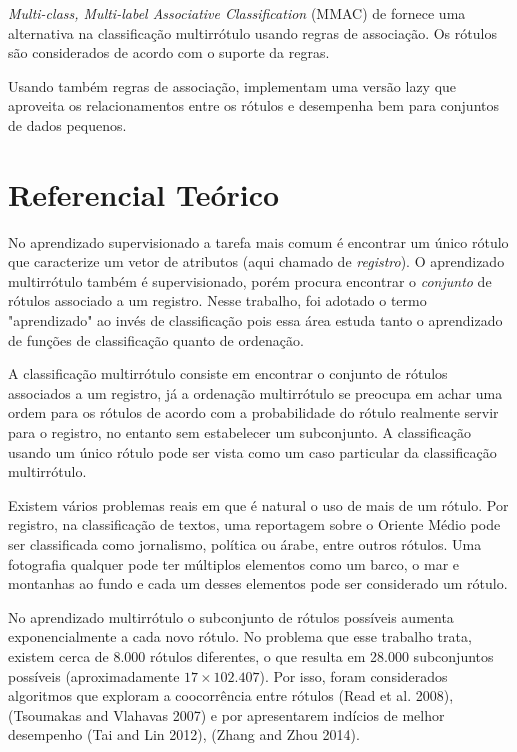 \documentclass[runningheads,a4paper]{llncs}
\begin{document}
\textit{Multi-class, Multi-label Associative Classification} (MMAC) de \cite{Thabtah2004-vz} fornece uma alternativa na classificação multirrótulo usando regras de associação. Os rótulos são considerados de acordo com o suporte da regras.

Usando também regras de associação, \cite{Veloso2007-el} implementam uma versão lazy que aproveita os relacionamentos entre os rótulos e desempenha bem para conjuntos de dados pequenos.

\section{Referencial Teórico}\label{sec:refteo}

No aprendizado supervisionado a tarefa mais comum é encontrar um único rótulo que  caracterize um vetor de atributos (aqui chamado de \emph{registro}). O aprendizado multirrótulo também é supervisionado, porém procura encontrar o \emph{conjunto} de rótulos associado a um registro. Nesse trabalho, foi adotado o termo "aprendizado" ao invés de classificação pois essa área estuda tanto o aprendizado de funções de classificação quanto de ordenação\cite{Zhang2014-be}.

A classificação multirrótulo consiste em encontrar o conjunto de rótulos associados a um registro, já a ordenação multirrótulo se preocupa em achar uma ordem para os rótulos de acordo com a probabilidade do rótulo realmente servir para o registro, no entanto sem estabelecer um subconjunto. A classificação usando um único rótulo pode ser vista como um caso particular da classificação multirrótulo.

Existem vários problemas reais em que é natural o uso de mais de um rótulo. Por registro, na classificação de textos, uma reportagem sobre o Oriente Médio pode ser classificada como jornalismo, política ou árabe, entre outros rótulos. Uma fotografia qualquer pode ter múltiplos elementos como um barco, o mar e montanhas ao fundo e cada um desses elementos pode ser considerado um rótulo.

No aprendizado multirrótulo o subconjunto de rótulos possíveis aumenta exponencialmente a cada novo rótulo. No problema que esse trabalho trata, existem cerca de 8.000 rótulos diferentes, o que resulta em 28.000 subconjuntos possíveis (aproximadamente $17 \times 102.407$). Por isso, foram considerados algoritmos que exploram a coocorrência entre rótulos (Read et al. 2008), (Tsoumakas and Vlahavas 2007) e por apresentarem indícios de melhor desempenho (Tai and Lin 2012), (Zhang and Zhou 2014). 
\end{document}

